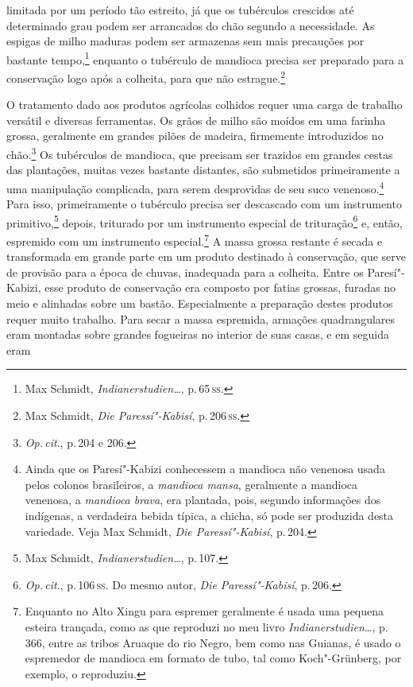 limitada por um período tão estreito, já que os tubérculos crescidos até
determinado grau podem ser arrancados do chão segundo a necessidade. As
espigas de milho maduras podem ser armazenas sem mais precauções por
bastante tempo,\footnote{Max Schmidt, \textit{Indianerstudien\ldots}, p.\,65\,\textsc{ss}.} enquanto o tubérculo de mandioca
precisa ser preparado para a conservação logo após a colheita, para que
não estrague.\footnote{Max Schmidt, \textit{Die Paressí"-Kabisí}, p.\,206\,\textsc{ss}.}

O tratamento dado aos produtos agrícolas colhidos requer uma carga de
trabalho versátil e diversas ferramentas. Os grãos de milho são moídos
em uma farinha grossa, geralmente em grandes pilões de madeira,
firmemente introduzidos no chão.\footnote{\textit{Op.\,cit}., p.\,204 e 206.} Os
tubérculos de mandioca, que precisam ser trazidos em grandes cestas das
plantações, muitas vezes bastante distantes, são submetidos
primeiramente a uma manipulação complicada, para serem desprovidas de
seu suco venenoso.\footnote{Ainda que os Paresí"-Kabizi conhecessem a
  mandioca não venenosa usada pelos colonos brasileiros, a \textit{mandioca
  mansa}, geralmente a mandioca venenosa, a \textit{mandioca brava}, era
  plantada, pois, segundo informações dos indígenas, a verdadeira bebida
  típica, a chicha, só pode ser produzida desta variedade. Veja Max
  Schmidt, \textit{Die Paressí"-Kabisí}, p.\,204.} Para isso,
primeiramente o tubérculo precisa ser descascado com um instrumento
primitivo,\footnote{Max Schmidt, \textit{Indianerstudien\ldots}, p.\,107.} depois, triturado por um instrumento
especial de trituração\footnote{\textit{Op.\,cit}., p.\,106\,\textsc{ss}. Do mesmo autor,
  \textit{Die Paressí"-Kabisí}, p.\,206.} e, então, espremido com um
instrumento especial.\footnote{Enquanto no Alto Xingu para espremer
  geralmente é usada uma pequena esteira trançada, como as que reproduzi
  no meu livro \textit{Indianerstudien\ldots}, p.\,366,
  entre as tribos Aruaque do rio Negro, bem como nas Guianas, é usado o
  espremedor de mandioca em formato de tubo, tal como Koch"-Grünberg, por
  exemplo, o reproduziu.} A massa grossa restante é secada e
transformada em grande parte em um produto destinado à conservação,
que serve de provisão para a época de chuvas, inadequada para a
colheita. Entre os Paresí"-Kabizi, esse produto de conservação era
composto por fatias grossas, furadas no meio e alinhadas sobre um
bastão. Especialmente a preparação destes produtos requer
muito trabalho. Para secar a massa espremida, armações quadrangulares
eram montadas sobre grandes fogueiras no interior de suas casas, e em seguida eram 
